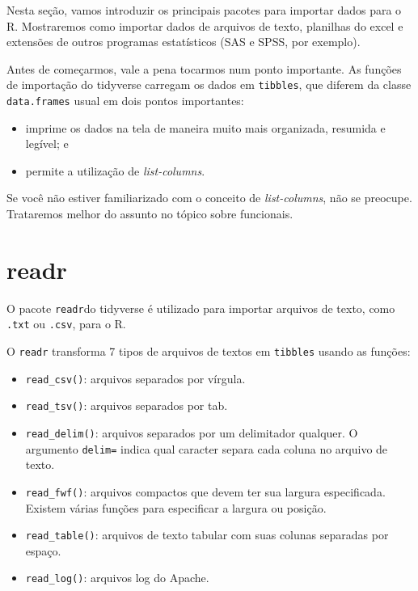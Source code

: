 \documentclass[
]{book}
\providecommand{\tightlist}{%
  \setlength{\itemsep}{0pt}\setlength{\parskip}{0pt}}
\begin{document}
Nesta seção, vamos introduzir os principais pacotes para importar dados para o R. Mostraremos como importar dados de arquivos de texto, planilhas do excel e extensões de outros programas estatísticos (SAS e SPSS, por exemplo).

Antes de começarmos, vale a pena tocarmos num ponto importante. As funções de importação do tidyverse carregam os dados em \texttt{tibbles}, que diferem da classe \texttt{data.frames} usual em dois pontos importantes:

\begin{itemize}
\item
  imprime os dados na tela de maneira muito mais organizada, resumida e legível; e
\item
  permite a utilização de \emph{list-columns}.
\end{itemize}

Se você não estiver familiarizado com o conceito de \emph{list-columns}, não se preocupe. Trataremos melhor do assunto no tópico sobre funcionais.

\hypertarget{readr}{%
\section{readr}\label{readr}}

O pacote \texttt{readr}do tidyverse é utilizado para importar arquivos de texto, como \texttt{.txt} ou \texttt{.csv}, para o R.

O \texttt{readr} transforma 7 tipos de arquivos de textos em \texttt{tibbles} usando as funções:

\begin{itemize}
\tightlist
\item
  \texttt{read\_csv()}: arquivos separados por vírgula.
\item
  \texttt{read\_tsv()}: arquivos separados por tab.
\item
  \texttt{read\_delim()}: arquivos separados por um delimitador qualquer. O argumento \texttt{delim=} indica qual caracter separa cada coluna no arquivo de texto.
\item
  \texttt{read\_fwf()}: arquivos compactos que devem ter sua largura especificada. Existem várias funções para especificar a largura ou posição.
\item
  \texttt{read\_table()}: arquivos de texto tabular com suas colunas separadas por espaço.
\item
  \texttt{read\_log()}: arquivos log do Apache.
\end{itemize}
\end{document}
